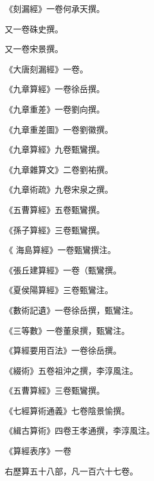 \begin{pinyinscope}
 《刻漏經》一卷何承天撰。



 又一卷硃史撰。



 又一卷宋景撰。



 《大唐刻漏經》一卷。



 《九章算經》一卷徐岳撰。



 《九章重差》一卷劉向撰。



 《九章重差圖》一卷劉徽撰。



 《九章算經》九卷甄鸞撰。



 《九章雜算文》二卷劉祐撰。



 《九章術疏》九卷宋泉之撰。



 《五曹算經》五卷甄鸞撰。



 《孫子算經》三卷甄鸞撰。



 《
 海島算經》一卷甄鸞撰注。



 《張丘建算經》一卷（甄鸞撰。



 《夏侯陽算經》三卷甄鸞注。



 《數術記遺》一卷徐岳撰，甄鸞注。



 《三等數》一卷董泉撰，甄鸞注。



 《算經要用百法》一卷徐岳撰。



 《綴術》五卷祖沖之撰，李淳風注。



 《五曹算經》三卷甄鸞撰。



 《七經算術通義》七卷陰景愉撰。



 《緝古算術》四卷王孝通撰，李淳風注。



 《算經表序》一卷



 右歷算五十八部，凡一百六十七卷。




\end{pinyinscope}
